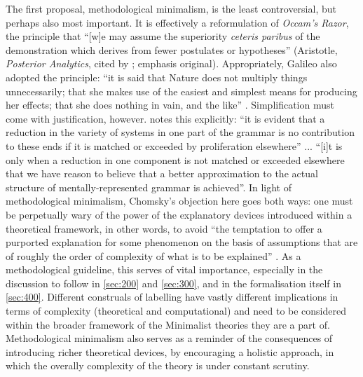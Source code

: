 The first proposal, methodological minimalism, is the least controversial, but perhaps also most important. It is effectively a reformulation of \textit{Occam's Razor}, the principle that ``[w]e may assume the superiority \textit{ceteris paribus} of the demonstration which derives from fewer postulates or hypotheses'' (Aristotle, \textit{Posterior Analytics}, cited by ; emphasis original). Appropriately, Galileo also adopted the principle: ``it is said that Nature does not multiply things unnecessarily; that she makes use of the easiest and simplest means for producing her effects; that she does nothing in vain, and the like'' \parencite[397]{Galileo_1967}. Simplification must come with justification, however. \textcite[13]{ChomskyN_1981} notes this explicitly: ``it is evident that a reduction in the variety of systems in one part of the grammar is no contribution to these ends if it is matched or exceeded by proliferation elsewhere'' ... ``[i]t is only when a reduction in one component is not matched or exceeded elsewhere that we have reason to believe that a better approximation to the actual structure of mentally-represented grammar is achieved''. In light of methodological minimalism, Chomsky's objection here goes both ways: one must be perpetually wary of the power of the explanatory devices introduced within a theoretical framework, in other words, to avoid ``the temptation to offer a purported explanation for some phenomenon on the basis of assumptions that are of roughly the order of complexity of what is to be explained'' \parencite[233]{ChomskyN_1995}. As a methodological guideline, this serves of vital importance, especially in the discussion to follow in \autoref{sec:200} and \autoref{sec:300}, and in the formalisation itself in \autoref{sec:400}. Different construals of labelling have vastly different implications in terms of complexity (theoretical and computational) and need to be considered within the broader framework of the Minimalist theories they are a part of. Methodological minimalism also serves as a reminder of the consequences of introducing richer theoretical devices, by encouraging a holistic approach, in which the overally complexity of the theory is under constant scrutiny.

